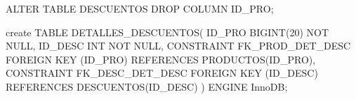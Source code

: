 ALTER TABLE DESCUENTOS
DROP COLUMN ID_PRO;

create TABLE DETALLES_DESCUENTOS(
ID_PRO BIGINT(20) NOT NULL,
ID_DESC INT NOT NULL,
CONSTRAINT FK_PROD_DET_DESC FOREIGN KEY (ID_PRO) REFERENCES PRODUCTOS(ID_PRO),
CONSTRAINT FK_DESC_DET_DESC FOREIGN KEY (ID_DESC) REFERENCES DESCUENTOS(ID_DESC)
) ENGINE InnoDB;